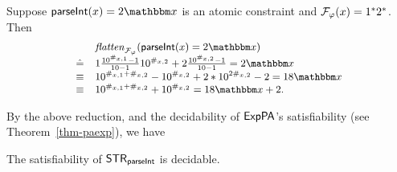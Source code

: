 \begin{example}
Suppose $\parseInt(\svarx) = 2\ivarx$ is an atomic constraint and $\mathcal{F}_\varphi(x) = 1^*2^*$. Then 
\[
\small
\begin{array}{l l}
& \flatten_{\flatfun_\varphi}(\parseInt(\svarx)  =  2\ivarx)  \\
\Def & 1 \frac{10^{\#_{\svarx,1}}-1}{10-1}10^{\#_{\svarx,2}}  + 2 \frac{10^{\#_{\svarx,2}}-1}{10-1} = 2\ivarx   \\
\equiv & 10^{\#_{\svarx,1}+\#_{\svarx,2}} - 10^{\#_{\svarx,2}}  + 2*10^{2\#_{\svarx,2}}- 2 = 18\ivarx \\
\equiv & 10^{\#_{\svarx,1}+\#_{\svarx,2}} +  10^{\#_{\svarx,2}} = 18\ivarx + 2.
\end{array}
\]
\end{example}

By the above reduction, and the decidability of ${\sf ExpPA}$'s satisfiability (see Theorem~\ref{thm-paexp}), we have 
\begin{theorem} \label{thm:string-parInt}
	The satisfiability of  ${\sf STR}_{\textsf{parseInt}}$ is decidable. 
\end{theorem}


